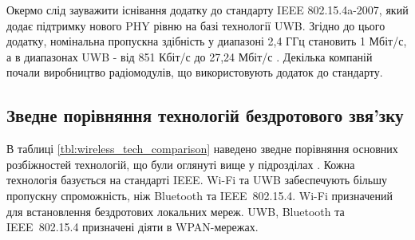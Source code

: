 \documentclass[a4paper,ukrainian,utf8,nocolumnsxix,floatsection,equationsection]{eskdtext}
\newcommand{\todoi}[1]{\todo[inline]{#1}}
\newcommand{\iee}[0]{IEEE~802.15.4\xspace}
\begin{document}
Окермо слід зауважити існівання додатку до стандарту IEEE 802.15.4a-2007, який додає підтримку нового PHY рівню на базі технології UWB. Згідно до цього додатку, номінальна пропускна здібність у диапазоні 2,4 ГГц становить 1 Мбіт/с, а в диапазонах UWB - від 851 Кбіт/с до 27,24 Мбіт/с \cite{802154a:overview}. Декілька компаній почали виробництво радіомодулів, що використовують додаток до стандарту.




\subsection{Зведне порівняння технологій бездротового звя’зку}

В таблиці \ref{tbl:wireless_tech_comparison} наведено зведне порівняння основних розбіжностей технологій, що були оглянуті вище у підрозділах . Кожна технологія базується на стандарті IEEE. Wi-Fi та UWB забеспечують більшу пропускну спроможність, ніж Bluetooth та \iee. Wi-Fi призначений для встановлення бездротових локальних мереж. UWB, Bluetooth та \iee призначені діяти в WPAN-мережах.
\end{document}

